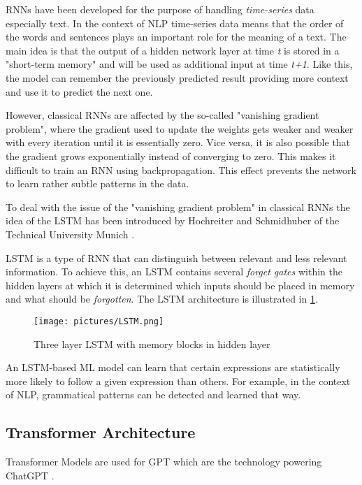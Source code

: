 \acp{RNN} have been developed for the purpose of handling \textit{time-series} data especially text. In the context of \ac{NLP} time-series data means that the order of the words and sentences plays an important role for the meaning of a text. 
The main idea is that the output of a hidden network layer at time \textit{t} is stored in a "short-term memory" and will be used as additional input at time \textit{t+1}. Like this, the model can remember the previously predicted result providing more context and use it to predict the next one. \cite{hochreiter1997long,gers2000learning}

However, classical \acp{RNN} are affected by the so-called "vanishing gradient problem", where the gradient used to update the weights gets weaker and weaker with every iteration until it is essentially zero. Vice versa, it is also possible that the gradient grows exponentially instead of converging to zero. This makes it difficult to train an \ac{RNN} using backpropagation. This effect prevents the network to learn rather subtle patterns in the data. \cite{hochreiter2001gradient}

To deal with the issue of the "vanishing gradient problem" in classical \acp{RNN} the idea of the \ac{LSTM} has been introduced by Hochreiter and Schmidhuber of the Technical University Munich \cite{hochreiter1997long}. 

\ac{LSTM} is a type of \ac{RNN} that can distinguish between relevant and less relevant information. To achieve this, an \ac{LSTM} contains several \textit{forget gates} within the hidden layers at which it is determined which inputs should be placed in memory and what should be \textit{forgotten}. The \ac{LSTM} architecture is illustrated in \cref{pic:LSTM}.

\begin{figure}[ht]
    \centering 
    \texttt{[image: pictures/LSTM.png]}
    \caption{Three layer LSTM with memory blocks in hidden layer \cite{gers2000learning}}
    \label{pic:LSTM}    %
\end{figure}

An LSTM-based ML model can learn that certain expressions are statistically more likely to follow a given expression than others. For example, in the context of \ac{NLP}, grammatical patterns can be detected and learned that way.
\cite{hochreiter1997long,hochreiter2001gradient}

\subsection{Transformer Architecture}
\label{Transformer}
Transformer Models are used for \ac{GPT} which are the technology powering ChatGPT \cite{brown2020language}.
\cite{vaswaniattentionneed}

